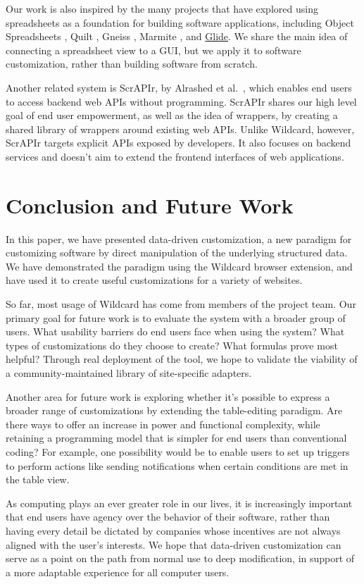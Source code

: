 \documentclass[sigplan,screen,10pt,anonymous,review]{acmart}
\begin{document}
Our work is also inspired by the many projects that have explored using
spreadsheets as a foundation for building software applications,
including Object Spreadsheets \citep{mccutchen2016}, Quilt
\citep{benson2014}, Gneiss \citep{chang2014}, Marmite \citep{wong2007},
and \href{https://www.glideapps.com/}{Glide}. We share the main idea of
connecting a spreadsheet view to a GUI, but we apply it to software
customization, rather than building software from scratch.

Another related system is ScrAPIr, by Alrashed et
al.~\citep{alrashed2020}, which enables end users to access backend web
APIs without programming. ScrAPIr shares our high level goal of end user
empowerment, as well as the idea of wrappers, by creating a shared
library of wrappers around existing web APIs. Unlike Wildcard, however,
ScrAPIr targets explicit APIs exposed by developers. It also focuses on
backend services and doesn't aim to extend the frontend interfaces of
web applications.

\hypertarget{sec:conclusion}{%
\section{Conclusion and Future Work}\label{sec:conclusion}}

In this paper, we have presented data-driven customization, a new
paradigm for customizing software by direct manipulation of the
underlying structured data. We have demonstrated the paradigm using the
Wildcard browser extension, and have used it to create useful
customizations for a variety of websites.

So far, most usage of Wildcard has come from members of the project
team. Our primary goal for future work is to evaluate the system with a
broader group of users. What usability barriers do end users face when
using the system? What types of customizations do they choose to create?
What formulas prove most helpful? Through real deployment of the tool,
we hope to validate the viability of a community-maintained library of
site-specific adapters.

Another area for future work is exploring whether it's possible to
express a broader range of customizations by extending the table-editing
paradigm. Are there ways to offer an increase in power and functional
complexity, while retaining a programming model that is simpler for end
users than conventional coding? For example, one possibility would be to
enable users to set up triggers to perform actions like sending
notifications when certain conditions are met in the table view.

As computing plays an ever greater role in our lives, it is increasingly
important that end users have agency over the behavior of their
software, rather than having every detail be dictated by companies whose
incentives are not always aligned with the user's interests. We hope
that data-driven customization can serve as a point on the path from
normal use to deep modification, in support of a more adaptable
experience for all computer users.



\end{document}
